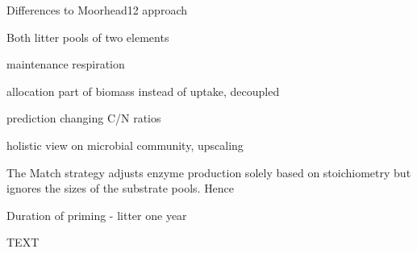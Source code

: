  
 
 

Differences to Moorhead12 approach

Both litter pools of two elements

maintenance respiration

allocation part of biomass instead of uptake, decoupled

prediction changing C/N ratios

holistic view on microbial community, upscaling


The Match strategy adjusts enzyme production solely based on stoichiometry but
ignores the sizes of the substrate pools. Hence

Duration of priming - litter one year




\conclusions  %
TEXT

